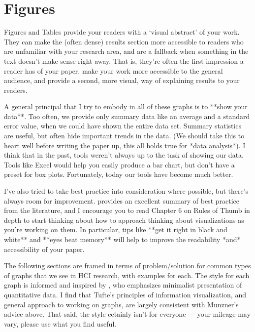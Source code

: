 \newpage

%
%


\section{Figures}
\label{sec:figures}

\begin{markdown}
Figures and Tables provide your readers with a `visual abstract' of your work. They can make the (often dense) results section more accessible to readers who are unfamiliar with your research area, and are a fallback when something in the text doesn't make sense right away. That is, they're often the first impression a reader has of your paper, make your work more accessible to the general audience, and provide a second, more visual, way of explaining results to your readers.

A general principal that I try to embody in all of these graphs is to **show your data**. Too often, we provide only summary data like an average and a standard error value, when we could have shown the entire data set. Summary statistics are useful, but often hide important trends in the data. (We should take this to heart well before writing the paper up, this all holds true for *data analysis*). I think that in the past, tools weren't always up to the task of showing our data. Tools like Excel would help you easily produce a bar chart, but don't have a preset for box plots. Fortunately, today our tools have become much better. 

I've also tried to take best practice into consideration where possible, but there's always room for improvement. \citet{munznervisualization} provides an excellent summary of best practice from the literature, and I encourage you to read Chapter 6 on Rules of Thumb in depth to start thinking about how to approach thinking about visualizations as you're working on them. In particular, tips like **get it right in black and white** and **eyes beat memory** will help to improve the readability *and* accessibility of your paper. 

The following sections are framed in terms of problem/solution for common types of graphs that we see in HCI research, with examples for each. The style for each graph is informed and inspired by \citet{tufte1983visual}, who emphasizes minimalist presentation of quantitative data. I find that Tufte's principles of information visualization, and general approach to working on graphs, are largely consistent with Munzner's advice above. That said, the style cetainly isn't for everyone --- your mileage may vary, please use what you find useful.  


 \end{markdown}
 

